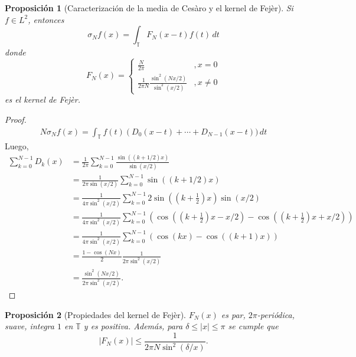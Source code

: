 \documentclass{article}
\newtheorem{Proposicion}{Proposición}
\theoremstyle{plain}
\theoremstyle{definition}
\newcommand{\T}{\mathbb{T}}
\newcommand{\abs}[1]{\lvert #1 \rvert}
\begin{document}
\begin{Proposicion}[Caracterización de la media de Cesàro y el kernel de Fejèr]
  Si \(f\in L^2\), entonces
  \begin{displaymath}
    \sigma_N f(x) = \int_{\T} F_N(x-t) f(t) \, dt
  \end{displaymath}
  donde
  \begin{displaymath}
    F_N(x) = 
    \begin{cases}
      \frac{N}{2\pi} &, x=0\\
      \frac{1}{2\pi N} \frac{\sin^2(Nx/2)}{\sin^2(x/2)} &, x\ne0
    \end{cases}
  \end{displaymath}
  es el kernel de Fejèr.
\end{Proposicion}
\begin{proof}
  \begin{align*}
    N \sigma_{N} f (x)
    =
    \int_{\T} f(t) \left( D_0(x-t) + \cdots + D_{N-1}(x-t) ) \, dt
  \end{align*}
  Luego,
  \begin{align*}
    \sum_{k=0}^{N-1} D_k (x)
    &=
    \frac{1}{2\pi} 
    \sum_{k=0}^{N-1} \frac{\sin((k+1/2)x)}{\sin(x/2)}
    \\&=
    \frac{1}{2\pi \sin(x/2)} 
    \sum_{k=0}^{N-1} \sin((k+1/2)x)
    \\&=
    \frac{1}{4\pi \sin^2(x/2)} 
    \sum_{k=0}^{N-1} 2\sin\left( (k+\frac{1}{2}) x \right) \sin(x/2)
    \\&=
    \frac{1}{4\pi \sin^2(x/2)} 
    \sum_{k=0}^{N-1} 
    \left(
      \cos\left( (k+\frac{1}{2})x - x/2 \right) 
      - 
      \cos\left( (k+\frac{1}{2})x + x/2 \right)
    \right)
    \\&=
    \frac{1}{4\pi \sin^2(x/2)} 
    \sum_{k=0}^{N-1} 
    \left(
      \cos\left( kx \right)
      - 
      \cos\left( (k+1)x \right) 
    \right)
    \\&=
    \frac{1 - \cos(Nx)}{2} \frac{1}{2\pi \sin^2(x/2)} 
    \\&=
    \frac{\sin^2(Nx/2)}{2\pi\sin^2(x/2)}.
  \end{align*}
\end{proof}

\begin{Proposicion}[Propiedades del kernel de Fejèr]
  \(F_N(x)\) es par, \(2\pi\){-}periódica, suave, integra \(1\) en \(\T\) y es positiva.
  Además, para \(\delta \le \abs{x} \le \pi\) se cumple que 
  \begin{displaymath}
    \abs{F_N(x)} \le \frac{1}{2\pi N \sin^{2}(\delta/x)}.
  \end{displaymath}
\end{Proposicion}
\end{document}
